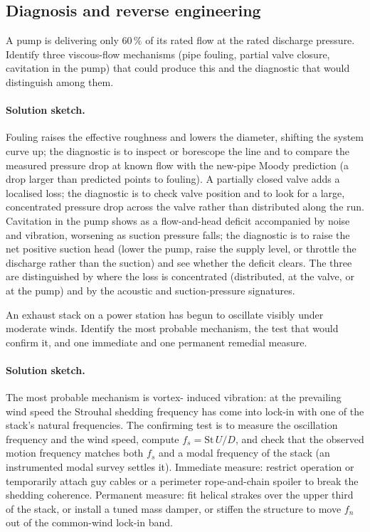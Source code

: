 \subsection*{Diagnosis and reverse engineering}

\begin{exercise}
A pump is delivering only $60\,\%$ of its rated flow at the rated
discharge pressure. Identify three viscous-flow mechanisms (pipe
fouling, partial valve closure, cavitation in the pump) that could
produce this and the diagnostic that would distinguish among them.

\paragraph{Solution sketch.} Fouling raises the effective roughness
and lowers the diameter, shifting the system curve up; the diagnostic
is to inspect or borescope the line and to compare the measured
pressure drop at known flow with the new-pipe Moody prediction (a
drop larger than predicted points to fouling). A partially closed
valve adds a localised loss; the diagnostic is to check valve
position and to look for a large, concentrated pressure drop across
the valve rather than distributed along the run. Cavitation in the
pump shows as a flow-and-head deficit accompanied by noise and
vibration, worsening as suction pressure falls; the diagnostic is to
raise the net positive suction head (lower the pump, raise the supply
level, or throttle the discharge rather than the suction) and see
whether the deficit clears. The three are distinguished by where the
loss is concentrated (distributed, at the valve, or at the pump) and
by the acoustic and suction-pressure signatures.
\end{exercise}

\begin{exercise}
An exhaust stack on a power station has begun to oscillate
visibly under moderate winds. Identify the most probable
mechanism, the test that would confirm it, and one immediate and
one permanent remedial measure.

\paragraph{Solution sketch.} The most probable mechanism is vortex-
induced vibration: at the prevailing wind speed the Strouhal shedding
frequency has come into lock-in with one of the stack's natural
frequencies. The confirming test is to measure the oscillation
frequency and the wind speed, compute $f_s = \text{St}\,U/D$, and
check that the observed motion frequency matches both $f_s$ and a
modal frequency of the stack (an instrumented modal survey settles
it). Immediate measure: restrict operation or temporarily attach
guy cables or a perimeter rope-and-chain spoiler to break the
shedding coherence. Permanent measure: fit helical strakes over the
upper third of the stack, or install a tuned mass damper, or stiffen
the structure to move $f_n$ out of the common-wind lock-in band.
\end{exercise}

